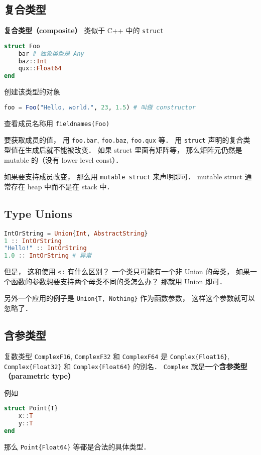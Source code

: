 \subsection{复合类型}
\textbf{复合类型（composite）} 类似于 C++ 中的 \verb|struct|
\begin{lstlisting}[language=julia]
struct Foo
    bar # 抽象类型是 Any
    baz::Int
    qux::Float64
end
\end{lstlisting}
创建该类型的对象
\begin{lstlisting}[language=julia]
foo = Foo("Hello, world.", 23, 1.5) # 叫做 constructor
\end{lstlisting}
查看成员名称用 \verb|fieldnames(Foo)|

要获取成员的值， 用 \verb|foo.bar|, \verb|foo.baz|, \verb|foo.qux| 等． 用 \verb|struct| 声明的复合类型值在生成后就不能被改变． 如果 struct 里面有矩阵等， 那么矩阵元仍然是 mutable 的（没有 lower level const）．

如果要支持成员改变， 那么用 \verb|mutable struct| 来声明即可． mutable struct 通常存在 heap 中而不是在 stack 中．

\subsection{Type Unions}
\begin{lstlisting}[language=julia]
IntOrString = Union{Int, AbstractString}
1 :: IntOrString
"Hello!" :: IntOrString
1.0 :: IntOrString # 异常
\end{lstlisting}
但是， 这和使用 \verb|<:| 有什么区别？ 一个类只可能有一个非 Union 的母类， 如果一个函数的参数想要支持两个母类不同的类怎么办？ 那就用 Union 即可．

另外一个应用的例子是 \verb|Union{T, Nothing}| 作为函数参数， 这样这个参数就可以忽略了．

\subsection{含参类型}

复数类型 \verb|ComplexF16|, \verb|ComplexF32| 和 \verb|ComplexF64| 是 \verb|Complex{Float16}|, \verb|Complex{Float32}| 和 \verb|Complex{Float64}| 的别名． \verb|Complex| 就是一个\textbf{含参类型（parametric type）}

例如
\begin{lstlisting}[language=julia]
struct Point{T}
    x::T
    y::T
end
\end{lstlisting}
那么 \verb|Point{Float64}| 等都是合法的具体类型．

